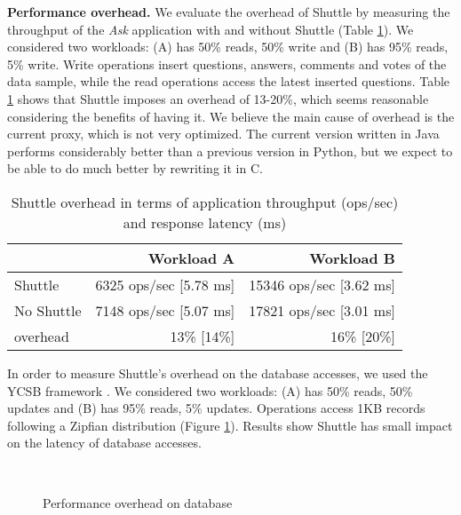 \textbf{Performance overhead.}
We evaluate the overhead of Shuttle by measuring the throughput of the \textit{Ask} application with and without Shuttle (Table \ref{tab:throughput}). We considered two workloads: (A) has 50\% reads, 50\% write and (B) has 95\% reads, 5\% write. Write operations insert questions, answers, comments and votes of the data sample, while the read operations access the latest inserted questions. Table \ref{tab:throughput} shows that Shuttle imposes an overhead of 13-20\%, which seems reasonable considering the benefits of having it. We believe the main cause of overhead is the current proxy, which is not very optimized. The current version written in Java performs considerably better than a previous version in Python, but we expect to be able to do much better by rewriting it in C.\\

\begin{table}
\footnotesize
\begin{tabular}{l|rr}
                       &  Workload A                    & Workload B  \\ \hline
Shuttle                &  6325 ops/sec [5.78 ms]        &  15346 ops/sec [3.62 ms]  \\
No Shuttle             &  7148 ops/sec [5.07 ms]        &  17821 ops/sec [3.01 ms]  \\
overhead               &  13\% [14\%]                    & 16\% [20\%] \\
\end{tabular}
\caption{Shuttle overhead in terms of application throughput (ops/sec) and response latency (ms)}
\label{tab:throughput}
\vspace{-3mm}
\end{table}

In order to measure Shuttle's overhead on the database accesses, we used the \acf{YCSB} framework \cite{ycsb}. We considered two workloads: (A) has 50\% reads, 50\% updates and (B) has 95\% reads, 5\% updates. Operations access 1KB records following a Zipfian distribution (Figure \ref{fig:database_overhead}). Results show Shuttle has small impact on the latency of database accesses. 

\begin{figure}[tbh]
\vspace{-6mm}
\hspace*{-0.5cm}
  \LARGE
  \mbox{
  }
  \caption{Performance overhead on database}
  \vspace{-2mm}
  \label{fig:database_overhead}
\end{figure}



